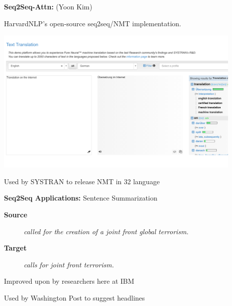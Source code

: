 \documentclass{beamer}
\let\tempone\itemize
\let\temptwo\enditemize
\renewenvironment{itemize}{\tempone\addtolength{\itemsep}{0.5\baselineskip}}{\temptwo}
\newcommand{\air}{\vspace{0.25cm}}
\newcommand{\mair}{\vspace{-0.25cm}}
\newcommand{\Cite}[1]{{\footnotesize \citep{#1}}}
\begin{document}
\begin{frame}
  \centerline{\textbf{Seq2Seq-Attn:}  (Yoon Kim) }

  \begin{itemize}
  \item HarvardNLP's open-source seq2seq/NMT implementation.
  \end{itemize}

  \begin{center}
    \includegraphics[width=0.9\textwidth]{systran}
  \end{center}

  \begin{itemize}
  \item Used by SYSTRAN to release NMT in 32 language \Cite{systran}
  \end{itemize}
\end{frame}


\begin{frame}
  \centerline{\textbf{Seq2Seq Applications:} \alert{Sentence Summarization} \Cite{Rush2015} }
  \begin{center}
    \textbf{Source}
  \end{center}
  
  \begin{figure}
    \textit{
      called  for the creation of
      a joint front  global terrorism. }
  \end{figure}

  \begin{center}
    \textbf{Target}
  \end{center}
  \mair

  \begin{figure}
    \centering
    \textit{ calls for joint
      front  terrorism.}
  \end{figure}

\air
\air

  \begin{itemize}
  \item Improved upon by researchers here at IBM \Cite{nallapati2016sequence}
  \item Used by Washington Post to suggest headlines \Cite{shuguangwang}
  \end{itemize}
\end{frame}
\end{document}
